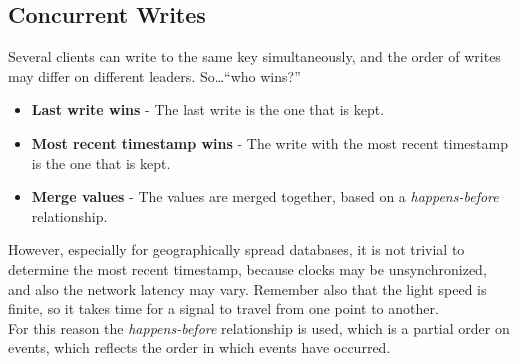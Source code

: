 \subsection{Concurrent Writes}
Several clients can write to the same key simultaneously, and the order of writes may differ on different leaders. So\dots ``who wins?''

\begin{itemize}
   \item \textbf{Last write wins} - The last write is the one that is kept.
   \item \textbf{Most recent timestamp wins} - The write with the most recent timestamp is the one that is kept.
   \item \textbf{Merge values} - The values are merged together, based on a \textit{happens-before} relationship.
\end{itemize}

However, especially for geographically spread databases, it is not trivial to determine the most recent timestamp, because clocks may be unsynchronized, and also the network latency may vary. Remember also that the light speed is finite, so it takes time for a signal to travel from one point to another.\\
For this reason the \textit{happens-before} relationship is used, which is a partial order on events, which reflects the order in which events have occurred.